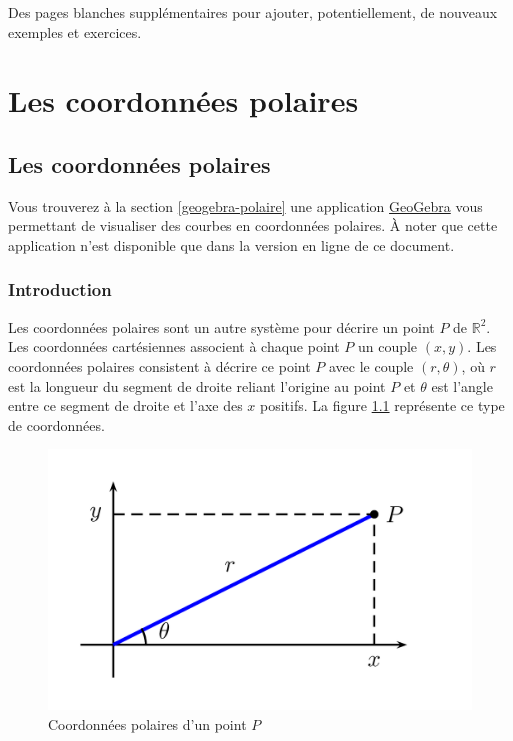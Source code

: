 \documentclass[]{book}
\theoremstyle{definition}
\theoremstyle{definition}
\theoremstyle{definition}
\theoremstyle{remark}
\begin{document}
Des pages blanches supplémentaires pour ajouter, potentiellement, de
nouveaux exemples et exercices.


\hypertarget{part-les-coordonnees-polaires}{%
\part{Les coordonnées
polaires}\label{part-les-coordonnees-polaires}}

\hypertarget{coordpolaires}{%
\chapter{Les coordonnées polaires}\label{coordpolaires}}

Vous trouverez à la section \ref{geogebra-polaire} une application
\href{https://www.geogebra.org/?lang=fr}{GeoGebra} vous permettant de
visualiser des courbes en coordonnées polaires. À noter que cette
application n'est disponible que dans la version en ligne de ce
document.

\hypertarget{introduction-2}{%
\section{Introduction}\label{introduction-2}}

Les coordonnées polaires sont un autre système pour décrire un point
\(P\) de \(\mathbb{R}^2\). Les coordonnées cartésiennes associent à
chaque point \(P\) un couple \((x,y)\). Les coordonnées polaires
consistent à décrire ce point \(P\) avec le couple \((r,\theta)\), où
\(r\) est la longueur du segment de droite reliant l'origine au point
\(P\) et \(\theta\) est l'angle entre ce segment de droite et l'axe des
\(x\) positifs. La figure \ref{fig:coordpolaires} représente ce type de
coordonnées.

\begin{figure}

{\centering \includegraphics[width=0.5\linewidth]{resources/images/latex/coordpolaires} 

}

\caption{Coordonnées polaires d'un point $P$}\label{fig:coordpolaires}
\end{figure}
\end{document}
